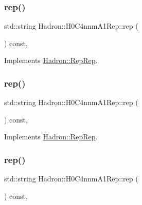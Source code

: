\subsubsection{\texorpdfstring{rep()}{rep()}\hspace{0.1cm}{\footnotesize\ttfamily [1/3]}}
{\footnotesize\ttfamily std\+::string Hadron\+::\+H0\+C4nnm\+A1\+Rep\+::rep (\begin{DoxyParamCaption}{ }\end{DoxyParamCaption}) const\hspace{0.3cm}{\ttfamily [inline]}, {\ttfamily [virtual]}}



Implements \mbox{\hyperlink{structHadron_1_1RepRep_ab3213025f6de249f7095892109575fde}{Hadron\+::\+Rep\+Rep}}.

\mbox{\label{structHadron_1_1H0C4nnmA1Rep_a99c77d4cddc66d00c5fbeb5e4927dfba}} 
\subsubsection{\texorpdfstring{rep()}{rep()}\hspace{0.1cm}{\footnotesize\ttfamily [2/3]}}
{\footnotesize\ttfamily std\+::string Hadron\+::\+H0\+C4nnm\+A1\+Rep\+::rep (\begin{DoxyParamCaption}{ }\end{DoxyParamCaption}) const\hspace{0.3cm}{\ttfamily [inline]}, {\ttfamily [virtual]}}



Implements \mbox{\hyperlink{structHadron_1_1RepRep_ab3213025f6de249f7095892109575fde}{Hadron\+::\+Rep\+Rep}}.

\mbox{\label{structHadron_1_1H0C4nnmA1Rep_a99c77d4cddc66d00c5fbeb5e4927dfba}} 
\subsubsection{\texorpdfstring{rep()}{rep()}\hspace{0.1cm}{\footnotesize\ttfamily [3/3]}}
{\footnotesize\ttfamily std\+::string Hadron\+::\+H0\+C4nnm\+A1\+Rep\+::rep (\begin{DoxyParamCaption}{ }\end{DoxyParamCaption}) const\hspace{0.3cm}{\ttfamily [inline]}, {\ttfamily [virtual]}}



